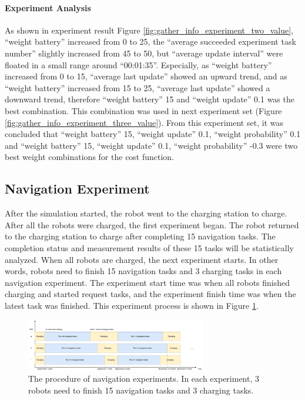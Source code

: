\paragraph{Experiment Analysis} 
As shown in experiment result Figure \ref{fig:gather_info_experiment_two_value}, ``weight battery'' increased from 0 to 25, the ``average succeeded experiment task number'' slightly increased from 45 to 50, but ``average update interval'' were floated in a small range around ``00:01:35''. Especially, as ``weight battery'' increased from 0 to 15, ``average last update'' showed an upward trend, and as ``weight battery'' increased from 15 to 25, ``average last update'' showed a downward trend, 
therefore ``weight battery'' 15 and ``weight update'' 0.1 was the best combination. 
This combination was used in next experiment set (Figure \ref{fig:gather_info_experiment_three_value}). From this experiment set, it was concluded that ``weight battery'' 15, ``weight update'' 0.1, ``weight probability'' 0.1 and ``weight battery'' 15, ``weight update'' 0.1, ``weight probability'' -0.3 were two best weight combinations for the cost function.



\subsection{Navigation Experiment}
After the simulation started, the robot went to the charging station to charge. After all the robots were charged, the first experiment began. The robot returned to the charging station to charge after completing 15 navigation tasks. The completion status and measurement results of these 15 tasks will be statistically analyzed. When all robots are charged, the next experiment starts. In other words, robots need to finish 15 navigation tasks and 3 charging tasks in each navigation experiment. The experiment start time was when all robots finished charging and started request tasks, and the experiment finish time was when the latest task was finished. This experiment process is shown in Figure  \ref{fig:nav_exp_timeline}.

\begin{figure}
\centering
\includegraphics[width = 0.7\textwidth]{content/images/ch5/exe_exp_timeline.drawio.png}
\caption{The procedure of navigation experiments. In each experiment, 3 robots need to finish 15 navigation tasks and 3 charging tasks.}
\label{fig:nav_exp_timeline}
\end{figure}


